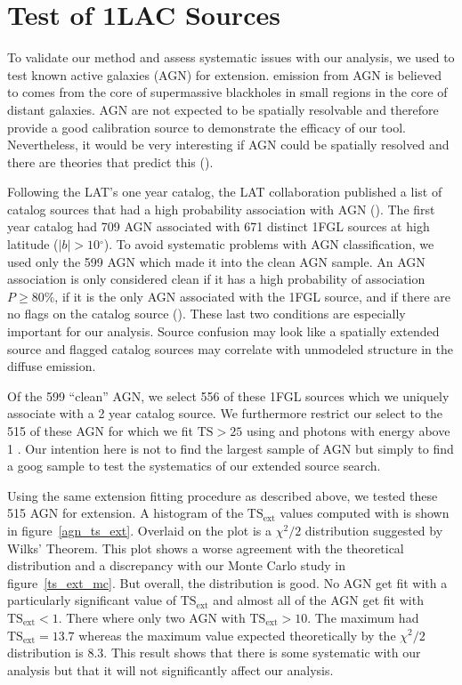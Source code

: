 \documentclass[12pt,preprint]{aastex}
\newcommand{\gev}{\text{GeV}\xspace}
\newcommand{\tsext}{{\ensuremath{\text{TS}_\text{ext}}}\xspace}
\newcommand{\ts}{\text{TS}\xspace}
\renewcommand{\deg}{\ensuremath{^\circ}\xspace}
\newcommand{\pointlike}{\text{\em pointlike}\xspace}
\begin{document}
\section{Test of 1LAC Sources}
\label{test_1lac_sources}

To validate our method and assess systematic issues with our analysis,
we used \pointlike to test known active galaxies (AGN) for extension.
\gev emission from AGN is believed to comes from the core of supermassive
blackholes in small regions in the core of distant galaxies.  AGN are
not expected to be spatially resolvable and therefore provide a good
calibration source to demonstrate the efficacy of our tool. Nevertheless,
it would be very interesting if AGN could be spatially resolved and
there are theories that predict this (\cite{pair_halo_paper}).

Following the LAT's one year catalog, the LAT collaboration published
a list of catalog sources that had a high probability association with
AGN (\cite{first_agn_cat}).
The first year catalog had 709 AGN associated with 671 distinct
1FGL sources at high latitude ($|b|>10\deg$).  To avoid systematic
problems with AGN classification, we used only the 599 AGN which made
it into the clean AGN sample.  An AGN association is only considered
clean if it has a high probability of association $P\ge 80\%$, if it is
the only AGN associated with the 1FGL source, and if there are no flags
on the catalog source (\cite{first_cat}). These last two conditions are
especially important for our analysis.  Source confusion may look like
a spatially extended source and flagged catalog sources may correlate
with unmodeled structure in the diffuse emission.

Of the 599 ``clean'' AGN, we select 556 of these 1FGL sources which
we uniquely associate with a 2 year catalog source. We furthermore
restrict our select to the 515 of these AGN for which we fit $\ts>25$
using \pointlike and photons with energy above 1 \gev.  Our intention
here is not to find the largest sample of AGN but simply
to find a goog sample to test the systematics of our extended source
search.

Using the same extension fitting procedure as described above, we tested
these 515 AGN for extension. A histogram of the \tsext values computed
with \pointlike is shown in figure~\ref{agn_ts_ext}. Overlaid on the plot
is a $\chi^2/2$ distribution suggested by Wilks' Theorem.  This plot
shows a worse agreement with the theoretical distribution and
a discrepancy with 
our Monte Carlo study in figure~\ref{ts_ext_mc}.  But overall, the
distribution is good. No AGN get fit with a particularly significant
value of $\tsext$ and almost all of the AGN get fit with $\tsext<1$.
There where only two AGN with $\tsext>10$. The maximum had $\tsext=13.7$
whereas the maximum value expected theoretically by the $\chi^2/2$ distribution is
8.3. This result shows that there is some systematic with our
analysis but that it will not significantly affect our analysis.
\end{document}
